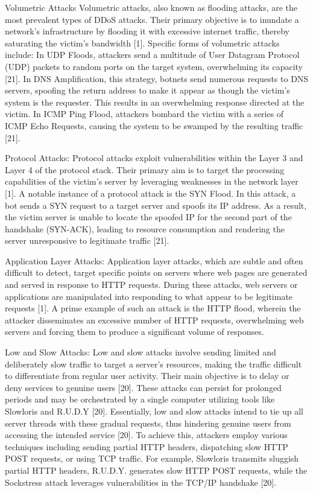 \documentclass[conference]{IEEEtran}
\begin{document}
Volumetric Attacks
Volumetric attacks, also known as flooding attacks, are the most prevalent types of DDoS attacks. Their primary objective is to inundate a network's infrastructure by flooding it with excessive internet traffic, thereby saturating the victim's bandwidth [1]. Specific forms of volumetric attacks include:
In UDP Floods, attackers send a multitude of User Datagram Protocol (UDP) packets to random ports on the target system, overwhelming its capacity [21].
In DNS Amplification, this strategy, botnets send numerous requests to DNS servers, spoofing the return address to make it appear as though the victim's system is the requester. This results in an overwhelming response directed at the victim.
In ICMP Ping Flood, attackers bombard the victim with a series of ICMP Echo Requests, causing the system to be swamped by the resulting traffic [21].

Protocol Attacks: 
Protocol attacks exploit vulnerabilities within the Layer 3 and Layer 4 of the protocol stack. Their primary aim is to target the processing capabilities of the victim's server by leveraging weaknesses in the network layer [1]. A notable instance of a protocol attack is the SYN Flood. In this attack, a bot sends a SYN request to a target server and spoofs its IP address. As a result, the victim server is unable to locate the spoofed IP for the second part of the handshake (SYN-ACK), leading to resource consumption and rendering the server unresponsive to legitimate traffic [21].

Application Layer Attacks:
 Application layer attacks, which are subtle and often difficult to detect, target specific points on servers where web pages are generated and served in response to HTTP requests. During these attacks, web servers or applications are manipulated into responding to what appear to be legitimate requests [1]. A prime example of such an attack is the HTTP flood, wherein the attacker disseminates an excessive number of HTTP requests, overwhelming web servers and forcing them to produce a significant volume of responses.

Low and Slow Attacks: 
Low and slow attacks involve sending limited and deliberately slow traffic to target a server's resources, making the traffic difficult to differentiate from regular user activity. Their main objective is to delay or deny services to genuine users [20]. These attacks can persist for prolonged periods and may be orchestrated by a single computer utilizing tools like Slowloris and R.U.D.Y [20]. Essentially, low and slow attacks intend to tie up all server threads with these gradual requests, thus hindering genuine users from accessing the intended service [20]. To achieve this, attackers employ various techniques including sending partial HTTP headers, dispatching slow HTTP POST requests, or using TCP traffic. For example, Slowloris transmits sluggish partial HTTP headers, R.U.D.Y. generates slow HTTP POST requests, while the Sockstress attack leverages vulnerabilities in the TCP/IP handshake [20].
\end{document}
